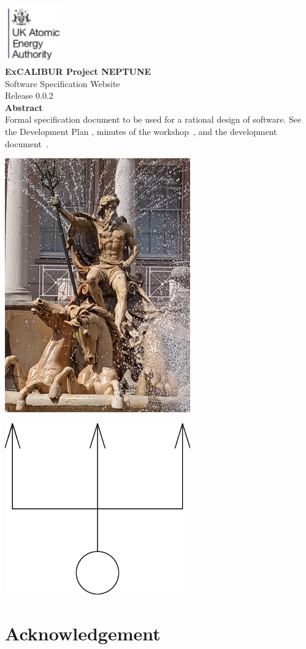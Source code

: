 \documentclass[11pt,twoside,a4paper]{report}
\newcommand{\culhamtitle}{\LARGE Software Specification Website  \\[1.0\baselineskip] Release 0.0.2}%
\begin{document}
\vspace*{-30mm}
\includegraphics[width=2.5cm]{./corpics/cofaplus.png} \\[2.0\baselineskip]
{\LARGE {\textbf{\textsf{ExCALIBUR Project NEPTUNE}}}\\[2.0\baselineskip]}
{\LARGE \culhamtitle } \\[2.0\baselineskip]
{\textbf{\textsf{Abstract}}}\\
Formal specification document to be used for a rational design of software.
See the Development Plan \cite{y2d34} , minutes
of the workshop~\cite{y3re181}, and the development document~\cite{y3re314}.
\vfill
\centerline{\includegraphics[width=8cm]{./png/neptune.png}}
\centerline{\includegraphics[width=8cm]{./png/trident.png}}
\tableofcontents
%
\clearpage

\clearpage
\chapter*{Acknowledgement}\label{sec:ackn}


%
%
\printbibliography
\end{document}
